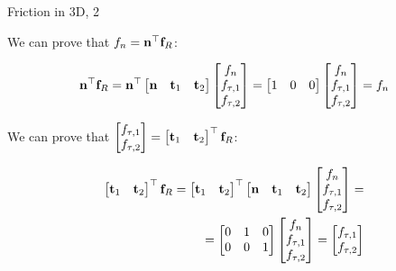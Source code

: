 \documentclass{beamer}
\begin{document}
\begin{frame}{Friction in 3D, 2}
	\begin{flushleft}
		
		We can prove that $f_n = \mathbf{n}^\top \mathbf{f}_R$:
		
		\begin{align}
			\mathbf{n}^\top \mathbf{f}_R = 
			\mathbf{n}^\top
			\begin{bmatrix}
				\mathbf{n} & \mathbf{t}_1 & \mathbf{t}_2
			\end{bmatrix}
			\begin{bmatrix}
				f_n \\ f_{\tau, 1} \\ f_{\tau, 2}
			\end{bmatrix}
		=
		\begin{bmatrix}
			1 & 0 & 0
		\end{bmatrix}
		\begin{bmatrix}
			f_n \\ f_{\tau, 1} \\ f_{\tau, 2}
		\end{bmatrix}
	=
	f_n 
		\end{align}
	
	
	We can prove that $\begin{bmatrix}
		f_{\tau, 1} \\ f_{\tau, 2}
	\end{bmatrix} = 
\begin{bmatrix}
\mathbf{t}_1 & \mathbf{t}_2
\end{bmatrix}^\top \mathbf{f}_R$:
	
	\begin{align}
		\begin{bmatrix}
			\mathbf{t}_1 & \mathbf{t}_2
		\end{bmatrix}^\top \mathbf{f}_R = 
		\begin{bmatrix}
			\mathbf{t}_1 & \mathbf{t}_2
		\end{bmatrix}^\top
		\begin{bmatrix}
			\mathbf{n} & \mathbf{t}_1 & \mathbf{t}_2
		\end{bmatrix}
		\begin{bmatrix}
			f_n \\ f_{\tau, 1} \\ f_{\tau, 2}
		\end{bmatrix}
		= \\
		=
		\begin{bmatrix}
			0 & 1 & 0 \\
			0 & 0 & 1
		\end{bmatrix}
		\begin{bmatrix}
			f_n \\ f_{\tau, 1} \\ f_{\tau, 2}
		\end{bmatrix}
		=
		\begin{bmatrix}
			f_{\tau, 1} \\ f_{\tau, 2}
		\end{bmatrix}
	\end{align}
		
		
	\end{flushleft}
\end{frame}
\end{document}
